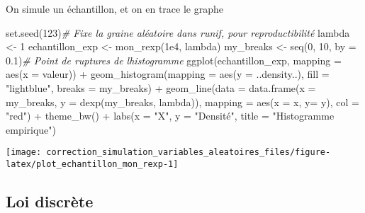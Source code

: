 \documentclass[
]{article}
\newenvironment{Shaded}{\begin{snugshade}}{\end{snugshade}}
\newcommand{\AttributeTok}[1]{\textcolor[rgb]{0.77,0.63,0.00}{#1}}
\newcommand{\CommentTok}[1]{\textcolor[rgb]{0.56,0.35,0.01}{\textit{#1}}}
\newcommand{\DecValTok}[1]{\textcolor[rgb]{0.00,0.00,0.81}{#1}}
\newcommand{\FloatTok}[1]{\textcolor[rgb]{0.00,0.00,0.81}{#1}}
\newcommand{\FunctionTok}[1]{\textcolor[rgb]{0.00,0.00,0.00}{#1}}
\newcommand{\NormalTok}[1]{#1}
\newcommand{\OtherTok}[1]{\textcolor[rgb]{0.56,0.35,0.01}{#1}}
\newcommand{\SpecialCharTok}[1]{\textcolor[rgb]{0.00,0.00,0.00}{#1}}
\newcommand{\StringTok}[1]{\textcolor[rgb]{0.31,0.60,0.02}{#1}}
\newenvironment{Correction}%
  { \vspace{\baselineskip}\begin{mdframed}[backgroundcolor=my_green]}%
  {\end{mdframed}}
\begin{document}
\begin{Correction}

On simule un échantillon, et on en trace le graphe

\end{Correction}

\begin{Shaded}
\begin{Highlighting}[]
\FunctionTok{set.seed}\NormalTok{(}\DecValTok{123}\NormalTok{)}\CommentTok{\# Fixe la graine aléatoire dans runif, pour reproductibilité}
\NormalTok{lambda }\OtherTok{\textless{}{-}} \DecValTok{1}
\NormalTok{echantillon\_exp }\OtherTok{\textless{}{-}} \FunctionTok{mon\_rexp}\NormalTok{(}\FloatTok{1e4}\NormalTok{, lambda)}
\NormalTok{my\_breaks }\OtherTok{\textless{}{-}} \FunctionTok{seq}\NormalTok{(}\DecValTok{0}\NormalTok{, }\DecValTok{10}\NormalTok{, }\AttributeTok{by =} \FloatTok{0.1}\NormalTok{)}\CommentTok{\# Point de ruptures de l\textquotesingle{}histogramme}
\FunctionTok{ggplot}\NormalTok{(echantillon\_exp,  }\AttributeTok{mapping =} \FunctionTok{aes}\NormalTok{(}\AttributeTok{x =}\NormalTok{ valeur)) }\SpecialCharTok{+}
  \FunctionTok{geom\_histogram}\NormalTok{(}\AttributeTok{mapping =} \FunctionTok{aes}\NormalTok{(}\AttributeTok{y =}\NormalTok{ ..density..), }\AttributeTok{fill =} \StringTok{"lightblue"}\NormalTok{,}
                 \AttributeTok{breaks =}\NormalTok{ my\_breaks) }\SpecialCharTok{+}
  \FunctionTok{geom\_line}\NormalTok{(}\AttributeTok{data =} \FunctionTok{data.frame}\NormalTok{(}\AttributeTok{x =}\NormalTok{ my\_breaks, }\AttributeTok{y =} \FunctionTok{dexp}\NormalTok{(my\_breaks, lambda)),}
            \AttributeTok{mapping =} \FunctionTok{aes}\NormalTok{(}\AttributeTok{x =}\NormalTok{ x, }\AttributeTok{y=}\NormalTok{ y), }\AttributeTok{col =} \StringTok{"red"}\NormalTok{) }\SpecialCharTok{+}
  \FunctionTok{theme\_bw}\NormalTok{() }\SpecialCharTok{+} \FunctionTok{labs}\NormalTok{(}\AttributeTok{x =} \StringTok{"X"}\NormalTok{, }\AttributeTok{y =} \StringTok{"Densité"}\NormalTok{, }\AttributeTok{title =} \StringTok{"Histogramme empirique"}\NormalTok{)}
\end{Highlighting}
\end{Shaded}

\begin{center}\texttt{[image: correction\_simulation\_variables\_aleatoires\_files/figure-latex/plot\_echantillon\_mon\_rexp-1]} \end{center}

\hypertarget{loi-discruxe8te}{%
\subsection{Loi discrète}\label{loi-discruxe8te}}
\end{document}
